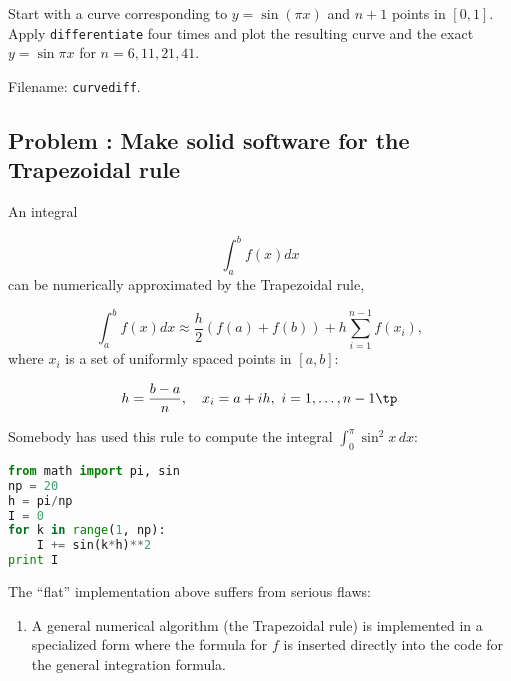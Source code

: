 \documentclass[graybox,sectrefs,envcountresetchap,open=right,final]{svmonodo}
\newenvironment{doconceexercise}{}{}
\newcounter{doconceexercisecounter}
\begin{document}
\begin{doconceexercise}
\noindent
{}
Start with a curve corresponding to $y=\sin(\pi x)$ and $n+1$
points in $[0,1]$. Apply \texttt{differentiate} four times and plot the
resulting curve and the exact $y=\sin\pi x$ for $n=6, 11, 21, 41$.



\noindent Filename: \texttt{curvediff}.

\end{doconceexercise}




\begin{doconceexercise}

\subsection*{Problem \thedoconceexercisecounter: Make solid software for the Trapezoidal rule}

\label{softeng1:exer:integral:flat}

An integral

\[ \int_a^b f(x)dx \]
can be numerically approximated by the Trapezoidal rule,

\[ \int_a^b f(x)dx \approx \frac{h}{2}(f(a) + f(b)) + h\sum_{i=1}^{n-1} f(x_i),
\]
where $x_i$ is a set of uniformly spaced points in $[a,b]$:

\[ h = \frac{b-a}{n},\quad x_i=a + ih,\ i=1,\ldots,n-1\tp \]

Somebody has used this rule to compute the integral $\int_0^\pi \sin^2x\, dx$:

\begin{lstlisting}[language=Python,style=blue1bar_bluegreen]
from math import pi, sin
np = 20
h = pi/np
I = 0
for k in range(1, np):
    I += sin(k*h)**2
print I
\end{lstlisting}


The ``flat'' implementation above suffers from serious flaws:

\begin{enumerate}
\item A general numerical algorithm (the Trapezoidal rule) is implemented
   in a specialized form where the formula for $f$ is inserted directly
   into the code for the general integration formula.


\end{enumerate}
\end{doconceexercise}
\end{document}
